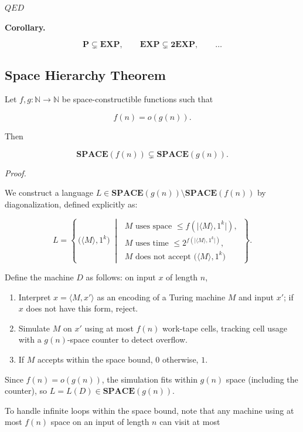 \documentclass[12pt,a4paper,openany]{article}
\begin{document}
\hfill $QED$

\bigskip

\textbf{Corollary.}

\[
\mathbf{P} \subsetneq \mathbf{EXP},
\qquad
\mathbf{EXP} \subsetneq \mathbf{2EXP},
\qquad \ldots
\]

\subsection{Space Hierarchy Theorem}

Let $f, g : \mathbb{N} \to \mathbb{N}$ be space-constructible functions such that

\[
f(n) = o(g(n)).
\]

Then

\[
\mathbf{SPACE}(f(n)) \subsetneq \mathbf{SPACE}(g(n)).
\]

\emph{Proof.}

We construct a language $L \in \mathbf{SPACE}(g(n)) \setminus \mathbf{SPACE}(f(n))$
by diagonalization, defined explicitly as:

\[
L = \left\{\, \big(\langle M \rangle, 1^k\big) \;\middle|\;
\begin{array}{l}
M \text{ uses space } \leq f\!\left(\big|\langle M \rangle, 1^k\big|\right), \\
M \text{ uses time } \leq 2^{f\!\left(\big|\langle M \rangle, 1^k\big|\right)}, \\
M \text{ does not accept } \big(\langle M \rangle, 1^k\big)
\end{array}
\,\right\}.
\]

Define the machine $D$ as follows: on input $x$ of length $n$,

\begin{enumerate}
    \item Interpret $x = \langle M, x' \rangle$ as an encoding of a Turing machine $M$
    and input $x'$; if $x$ does not have this form, reject.
    \item Simulate $M$ on $x'$ using at most $f(n)$ work-tape cells, tracking cell usage
    with a $g(n)$-space counter to detect overflow.
    \item If $M$ accepts within the space bound, $0$ otherwise, $1$.
\end{enumerate}

Since $f(n) = o(g(n))$, the simulation fits within $g(n)$ space (including the counter),
so $L = L(D) \in \mathbf{SPACE}(g(n))$.

To handle infinite loops within the space bound, note that any machine using at most
$f(n)$ space on an input of length $n$ can visit at most
\end{document}
